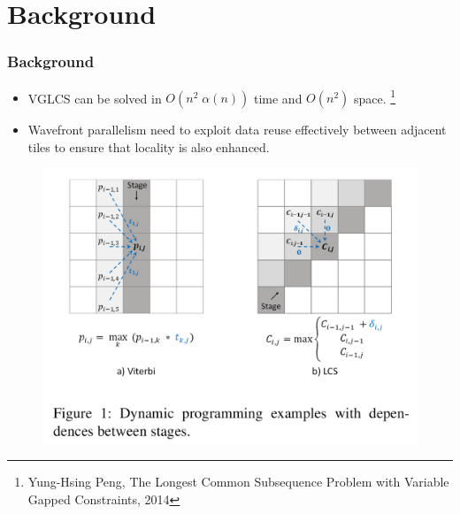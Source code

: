 \section{Background}

\begin{frame}
    \frametitle{Background}
    \begin{itemize}
    	\setlength\itemsep{1em}
    	\item VGLCS can be solved in $O(n^2 \; \alpha(n))$ time and $O(n^2)$ space.
    	\footnote{Yung-Hsing Peng, The Longest Common Subsequence Problem with Variable Gapped Constraints, 2014}
    	\item Wavefront parallelism need to exploit data reuse effectively between adjacent tiles to ensure that locality is also enhanced.
    \end{itemize}
    \begin{figure}
		\includegraphics[scale=0.10]{figure/fig-wavefront-dp.png}
	\end{figure}
\end{frame}